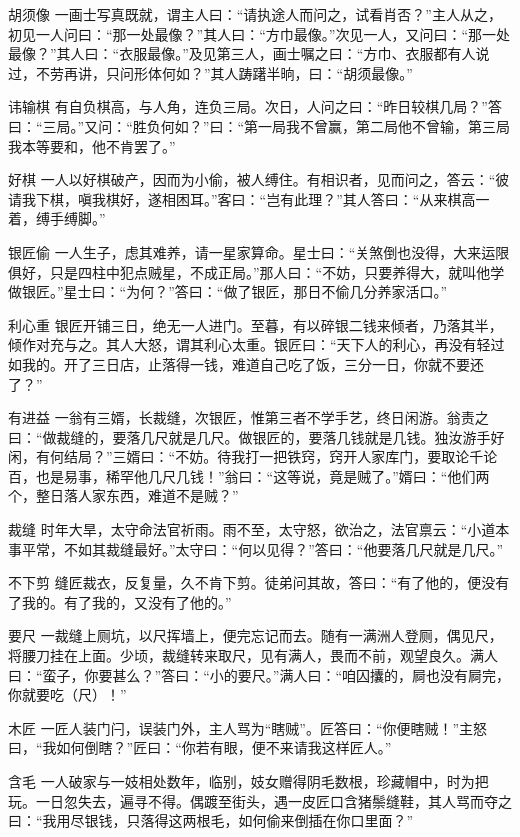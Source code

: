 \documentclass[12pt,UTF8]{ctexbook}
\begin{document}
胡须像
一画士写真既就，谓主人曰：“请执途人而问之，试看肖否？”主人从之，初见一人问曰：“那一处最像？”其人曰：“方巾最像。”次见一人，又问曰：“那一处最像？”其人曰：“衣服最像。”及见第三人，画士嘱之曰：“方巾、衣服都有人说过，不劳再讲，只问形体何如？”其人踌躇半晌，曰：“胡须最像。”

讳输棋
有自负棋高，与人角，连负三局。次日，人问之曰：“昨日较棋几局？”答曰：“三局。”又问：“胜负何如？”曰：“第一局我不曾赢，第二局他不曾输，第三局我本等要和，他不肯罢了。”

好棋
一人以好棋破产，因而为小偷，被人缚住。有相识者，见而问之，答云：“彼请我下棋，嗔我棋好，遂相困耳。”客曰：“岂有此理？”其人答曰：“从来棋高一着，缚手缚脚。”

银匠偷
一人生子，虑其难养，请一星家算命。星士曰：“关煞倒也没得，大来运限俱好，只是四柱中犯点贼星，不成正局。”那人曰：“不妨，只要养得大，就叫他学做银匠。”星士曰：“为何？”答曰：“做了银匠，那日不偷几分养家活口。”

利心重
银匠开铺三日，绝无一人进门。至暮，有以碎银二钱来倾者，乃落其半，倾作对充与之。其人大怒，谓其利心太重。银匠曰：“天下人的利心，再没有轻过如我的。开了三日店，止落得一钱，难道自己吃了饭，三分一日，你就不要还了？”

有进益
一翁有三婿，长裁缝，次银匠，惟第三者不学手艺，终日闲游。翁责之曰：“做裁缝的，要落几尺就是几尺。做银匠的，要落几钱就是几钱。独汝游手好闲，有何结局？”三婿曰：“不妨。待我打一把铁窍，窍开人家库门，要取论千论百，也是易事，稀罕他几尺几钱！”翁曰：“这等说，竟是贼了。”婿曰：“他们两个，整日落人家东西，难道不是贼？”

裁缝
时年大旱，太守命法官祈雨。雨不至，太守怒，欲治之，法官禀云：“小道本事平常，不如其裁缝最好。”太守曰：“何以见得？”答曰：“他要落几尺就是几尺。”

不下剪
缝匠裁衣，反复量，久不肯下剪。徒弟问其故，答曰：“有了他的，便没有了我的。有了我的，又没有了他的。”

要尺
一裁缝上厕坑，以尺挥墙上，便完忘记而去。随有一满洲人登厕，偶见尺，将腰刀挂在上面。少顷，裁缝转来取尺，见有满人，畏而不前，观望良久。满人曰：“蛮子，你要甚么？”答曰：“小的要尺。”满人曰：“咱囚攮的，屙也没有屙完，你就要吃（尺）！”

木匠
一匠人装门闩，误装门外，主人骂为“瞎贼”。匠答曰：“你便瞎贼！”主怒曰，“我如何倒瞎？”匠曰：“你若有眼，便不来请我这样匠人。”

含毛
一人破家与一妓相处数年，临别，妓女赠得阴毛数根，珍藏帽中，时为把玩。一日忽失去，遍寻不得。偶踱至街头，遇一皮匠口含猪鬃缝鞋，其人骂而夺之曰：“我用尽银钱，只落得这两根毛，如何偷来倒插在你口里面？”
\end{document}
